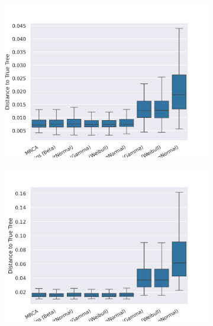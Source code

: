 \documentclass[10pt,letterpaper]{article}
\begin{document}
\begin{figure}[h!]
	\caption{The log squared branch distance to the true tree for point estimates using the different distributions and datasets. (The lower the better.)}
	
	\centering
	\begin{subfigure}[b]{0.45\textwidth}
		\centering
		\includegraphics[width=\textwidth]{figures/yule-100-ccd1-point-estimates.png}
	\end{subfigure}
	\begin{subfigure}[b]{0.45\textwidth}
		\centering
		\includegraphics[width=\textwidth]{figures/yule-200-ccd1-point-estimates.png}
	\end{subfigure}
	

\end{figure}
\end{document}
